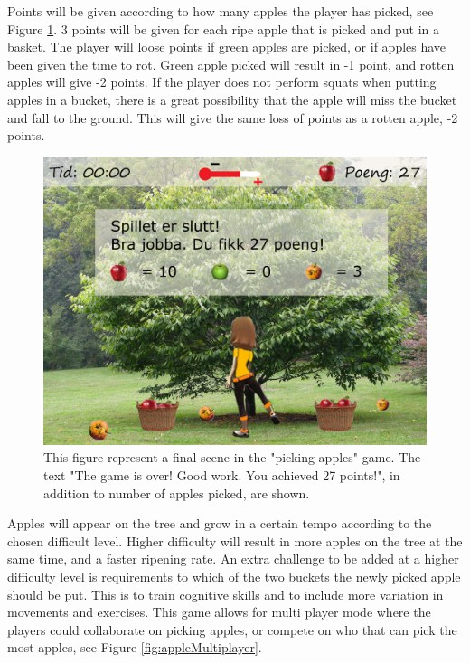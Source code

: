 Points will be given according to how many apples the player has picked, see Figure \ref{fig:appleOver}. 3 points will be given for each ripe apple that is picked and put in a basket. The player will loose points if green apples are picked, or if apples have been given the time to rot. Green apple picked will result in -1 point, and rotten apples will give -2 points. If the player does not perform squats when putting apples in a bucket, there is a great possibility that the apple will miss the bucket and fall to the ground. This will give the same loss of points as a rotten apple, -2 points.       

\begin{figure} [H]
\centering
\includegraphics[scale=0.1]{appletreeend.jpg}
\caption[Picking apples - points]{This figure represent a final scene in the "picking apples" game. The text "The game is over! Good work. You achieved 27 points!", in addition to number of apples picked, are shown.}
\label{fig:appleOver}
\end{figure}

Apples will appear on the tree and grow in a certain tempo according to the chosen difficult level. Higher difficulty will result in more apples on the tree at the same time, and a faster ripening rate. An extra challenge to be added at a higher difficulty level is requirements to which of the two buckets the newly picked apple should be put. This is to train cognitive skills and to include more variation in movements and exercises. This game allows for multi player mode where the players could collaborate on picking apples, or compete on who that can pick the most apples, see Figure \ref{fig:appleMultiplayer}. 

